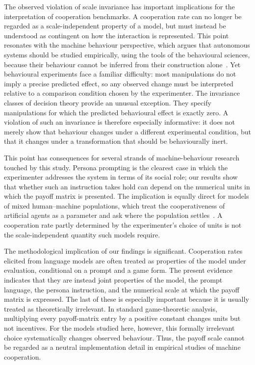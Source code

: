 \documentclass[11pt,a4paper]{article}
\begin{document}
The observed violation of scale invariance has important implications for the interpretation of cooperation benchmarks. A cooperation rate can no longer be regarded as a scale-independent property of a model, but must instead be understood as contingent on how the interaction is represented. This point resonates with the machine behaviour perspective, which argues that autonomous systems should be studied empirically, using the tools of the behavioural sciences, because their behaviour cannot be inferred from their construction alone~\cite{rahwan2019machine}. Yet behavioural experiments face a familiar difficulty: most manipulations do not imply a precise predicted effect, so any observed change must be interpreted relative to a comparison condition chosen by the experimenter. The invariance classes of decision theory provide an unusual exception. They specify manipulations for which the predicted behavioural effect is exactly zero. A violation of such an invariance is therefore especially informative: it does not merely show that behaviour changes under a different experimental condition, but that it changes under a transformation that should be behaviourally inert.

This point has consequences for several strands of machine-behaviour research touched by this study. Persona prompting is the clearest case in which the experimenter addresses the system in terms of its social role; our results show that whether such an instruction takes hold can depend on the numerical units in which the payoff matrix is presented. The implication is equally direct for models of mixed human--machine populations, which treat the cooperativeness of artificial agents as a parameter and ask where the population settles~\cite{santos2018social,han2013good,perc2017statistical,paiva2018engineering}. A cooperation rate partly determined by the experimenter's choice of units is not the scale-independent quantity such models require.


The methodological implication of our findings is significant. Cooperation rates elicited from language models are often treated as properties of the model under evaluation, conditional on a prompt and a game form. The present evidence indicates that they are instead joint properties of the model, the prompt language, the persona instruction, and the numerical scale at which the payoff matrix is expressed. The last of these is especially important because it is usually treated as theoretically irrelevant. 
In standard game-theoretic analysis, multiplying every payoff-matrix entry by a positive constant changes units but not incentives. 
For the models studied here, however, this formally irrelevant choice systematically changes observed behaviour. Thus, the payoff scale cannot be regarded as a neutral implementation detail in empirical studies of machine cooperation.
\end{document}
